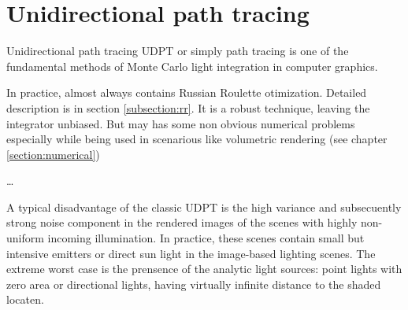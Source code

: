 \section{Unidirectional path tracing}
Unidirectional path tracing \gls{UDPT} or simply path tracing is one of the
fundamental methods of Monte Carlo light integration in computer graphics.

In practice, almost always contains Russian Roulette otimization. Detailed
description is in section \ref{subsection:rr}. It is a robust technique, leaving
the integrator unbiased. But may has some non obvious numerical problems
especially while being used in scenarious like volumetric rendering (see
chapter \ref{section:numerical})

\ldots

A typical disadvantage of the classic \gls{UDPT} is the high variance and
subsecuently strong noise component in the rendered images of the scenes with 
highly non-uniform incoming illumination.
In practice, these scenes contain small but intensive emitters or direct sun
light in the image-based lighting scenes. The extreme worst case is the
prensence of the analytic light sources: point lights with zero area or
directional lights, having virtually infinite distance to the shaded locaten.

